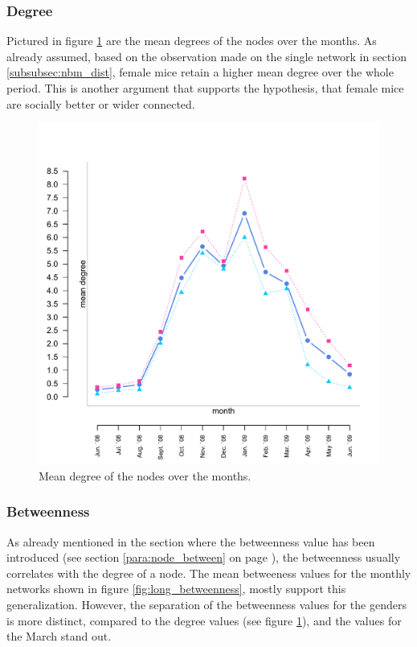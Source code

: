 \subsubsection{Degree}

Pictured in figure \ref{fig:long_degree} are the mean degrees of the nodes over the months. As already assumed, based on the observation made on the single network in section \ref{subsubsec:nbm_dist}, female mice retain a higher mean degree over the whole period. This is another argument that supports the hypothesis, that female mice are socially better or wider connected.

\begin{figure}[htpb]
\begin{center}
  \includegraphics[width=.6\textwidth]{assets/pdf/long_degree.pdf}
  \caption[Mean degree of the nodes over the months]{Mean degree of the nodes over the months.}
  \label{fig:long_degree}
\end{center}
\end{figure} 


\subsubsection{Betweenness}
\label{subsubsec:long_betweenness}

As already mentioned in the section where the betweenness value has been introduced (see section \ref{para:node_between} on page \pageref{para:node_between}), the betweenness usually correlates with the degree of a node. The mean betweeness values for the monthly networks shown in figure \ref{fig:long_betweenness}, mostly support this generalization. However, the separation of the betweenness values for the genders is more distinct, compared to the degree values (see figure \ref{fig:long_degree}), and the values for the March stand out.   

